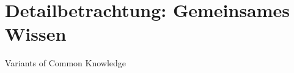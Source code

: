 \section{Detailbetrachtung: Gemeinsames Wissen}
\label{GemeinsamesWissen}
Variants of Common Knowledge

